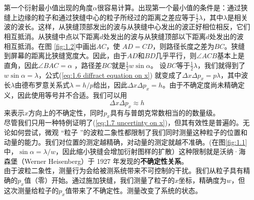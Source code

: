 	\indent 第一个衍射最小值出现的角度$\alpha$很容易计算。出现第一个最小值的条件是：通过狭缝上边缘的粒子和通过狭缝中心的粒子所经过的距离之差应等于$\frac{1}{2}\lambda$，其中$\lambda$是相关波的波长。这样，从狭缝顶部发出的波与从狭缝中心发出的波正好相位相反，它们相互抵消。从狭缝中点以下距离$d$处发出的波与从狭缝顶部以下距离$d$处发出的波相互抵消。在图 \ref{fig:1.2}中画出$AC$，使 $AD=CD$，则路径长度之差为$BC$。狭缝到屏幕的距离比狭缝宽度大。因此，由于$AD$和$BD$几乎平行，则$\angle ACB$基本上是直角，因此$\angle BAC = \alpha$ ，路径差$BC$就是$\frac{1}{2}w \sin \alpha$。 设$BC$等于$\frac{1}{2}\lambda$，我们就得到了$w\sin\alpha=\lambda$，公式(\ref{eq:1.6 diffract equation on x}) 就变成了$\Delta x \Delta p_x=p\lambda$，其中波长$\lambda$由德布罗意关系式$\lambda=h/p$给出，因此$\Delta x \Delta p_x=h$。由于不确定度尚未精确定义，因此使用等号并不合适。我们可以用 
	\begin{equation}
		\Delta x \Delta p_x \approx h
		\label{eq:1.7 uncertinty on x}
	\end{equation}
	来表示$x$方向上的不确定性，同时$p_x$具有与普朗克常数相当的的数量级。\\
	\indent 尽管我们只用一种特例证明了(\ref{eq:1.7 uncertinty on x})，但其有效性是普遍的。无论如何尝试，微观 “粒子 ”的波粒二象性都限制了我们同时测量这种粒子的位置和动量的能力。我们对位置的测定越精确，对动量的测定就越不准确。(在图\ref{fig:1.1}中，$\sin \alpha = \lambda / w$，因此缩小狭缝会增加衍射图样的扩散）这种限制就是沃纳·海森堡（Werner Heisenberg）于 1927 年发现的\textbf{不确定性关系}。\\
	\indent 由于波粒二象性，测量行为会给被测系统带来不可控制的干扰。我们从粒子具有精确的$p_x$值（零）开始。通过施加狭缝，我们测量了粒子的$x$坐标，精确度为$w$，但这次测量给粒子的$p_x$值带来了不确定性。测量改变了系统的状态。
	
	
